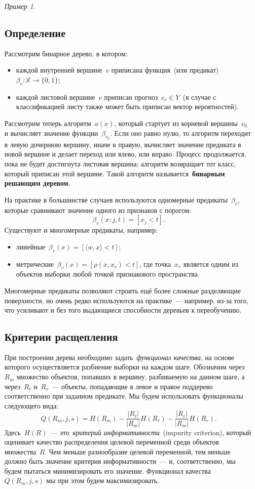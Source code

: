\documentclass[a4paper, 12pt]{article}
\def\XX{\mathbb{X}}
\theoremstyle{plain} %
\theoremstyle{definition} %
\theoremstyle{remark} %
\newtheorem{example}{Пример}
\begin{document}
\begin{example}
\subsection{Определение}

Рассмотрим бинарное дерево, в котором:
\begin{itemize}
    \item каждой внутренней вершине~$v$ приписана функция~(или предикат)~$\beta_v: \XX \to \{0, 1\}$;
    \item каждой листовой вершине~$v$ приписан прогноз~$c_v \in Y$~(в случае с классификацией
        листу также может быть приписан вектор вероятностей).
\end{itemize}
Рассмотрим теперь алгоритм~$a(x)$, который стартует из корневой вершины~$v_0$
и вычисляет значение функции~$\beta_{v_0}$.
Если оно равно нулю, то алгоритм переходит в левую дочернюю вершину, иначе в правую,
вычисляет значение предиката в новой вершине и делает переход или влево, или вправо.
Процесс продолжается, пока не будет достигнута листовая вершина;
алгоритм возвращает тот класс, который приписан этой вершине.
Такой алгоритм называется~\textbf{бинарным решающим деревом}.

На практике в большинстве случаев используются одномерные предикаты~$\beta_v$,
которые сравнивают значение одного из признаков с порогом:
\[
    \beta_v(x; j, t)
    =
    [x_j < t].
\]
Существуют и многомерные предикаты, например:
\begin{itemize}
    \item линейные~$\beta_v(x) = [\langle w, x \rangle < t]$;
    \item метрические~$\beta_v(x) = [\rho(x, x_v) < t]$, где точка~$x_v$ является одним из объектов выборки любой точкой
        признакового пространства.
\end{itemize}
Многомерные предикаты позволяют строить ещё более сложные разделяющие поверхности,
но очень редко используются на практике~--- например, из-за того,
что усиливают и без того выдающиеся способности деревьев к переобучению.

\subsection{Критерии расщепления}
При построении дерева необходимо задать~\emph{функционал качества},
на основе которого осуществляется разбиение выборки на каждом шаге.
Обозначим через~$R_m$ множество объектов, попавших в вершину, разбиваемую на данном шаге,
а через~$R_\ell$ и~$R_r$~--- объекты, попадающие в левое и правое поддерево соответственно
при заданном предикате.
Мы будем использовать функционалы следующего вида:
\[
    Q(R_m, j, s)
    =
    H(R_m)
    -
    \frac{|R_\ell|}{|R_m|}
    H(R_\ell)
    -
    \frac{|R_r|}{|R_m|}
    H(R_r).
\]
Здесь~$H(R)$~--- это~\emph{критерий информативности}~(impurity criterion),
который оценивает качество распределения целевой переменной среди объектов множества~$R$.
Чем меньше разнообразие целевой переменной, тем меньше должно быть значение критерия информативности~---
и, соответственно, мы будем пытаться минимизировать его значение.
Функционал качества~$Q(R_m, j, s)$ мы при этом будем максимизировать.


\end{example}
\end{document}
